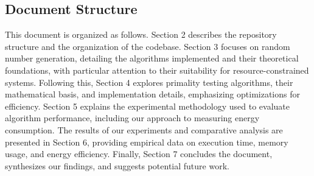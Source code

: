 \subsection{Document Structure}

This document is organized as follows. Section 2 describes the repository structure and the organization of the codebase. Section 3 focuses on random number generation, detailing the algorithms implemented and their theoretical foundations, with particular attention to their suitability for resource-constrained systems. Following this, Section 4 explores primality testing algorithms, their mathematical basis, and implementation details, emphasizing optimizations for efficiency. Section 5 explains the experimental methodology used to evaluate algorithm performance, including our approach to measuring energy consumption. The results of our experiments and comparative analysis are presented in Section 6, providing empirical data on execution time, memory usage, and energy efficiency. Finally, Section 7 concludes the document, synthesizes our findings, and suggests potential future work.